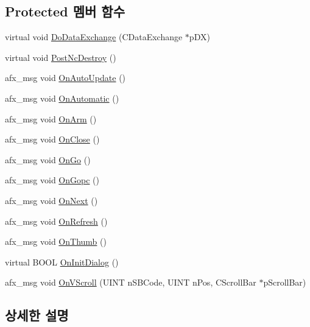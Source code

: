 \subsection*{Protected 멤버 함수}
\begin{DoxyCompactItemize}
\item 
virtual void \mbox{\hyperlink{class_disassemble_a41d0930174f47e08037b1ea675d03ba0}{Do\+Data\+Exchange}} (C\+Data\+Exchange $\ast$p\+DX)
\item 
virtual void \mbox{\hyperlink{class_disassemble_a2ff6c6b502de3f37aaff6c2f188157a8}{Post\+Nc\+Destroy}} ()
\item 
afx\+\_\+msg void \mbox{\hyperlink{class_disassemble_a5423cb1c85c1e4bb05b3d4018c804826}{On\+Auto\+Update}} ()
\item 
afx\+\_\+msg void \mbox{\hyperlink{class_disassemble_a713e75749b5c7c79927075b57431a298}{On\+Automatic}} ()
\item 
afx\+\_\+msg void \mbox{\hyperlink{class_disassemble_a11695fe0ce9003a5cfcd58e86ad6047e}{On\+Arm}} ()
\item 
afx\+\_\+msg void \mbox{\hyperlink{class_disassemble_a8f239c5117018f44ee0847b530a9eee1}{On\+Close}} ()
\item 
afx\+\_\+msg void \mbox{\hyperlink{class_disassemble_add1cb356f3605cc46f9c83f29473db24}{On\+Go}} ()
\item 
afx\+\_\+msg void \mbox{\hyperlink{class_disassemble_ad757b7defc104599f1a20730cf7f3d63}{On\+Gopc}} ()
\item 
afx\+\_\+msg void \mbox{\hyperlink{class_disassemble_a9d25720f4d6c7a31281301b93b0ae02a}{On\+Next}} ()
\item 
afx\+\_\+msg void \mbox{\hyperlink{class_disassemble_a9b66d72bb746fe9df6bbcb4831dbf8ad}{On\+Refresh}} ()
\item 
afx\+\_\+msg void \mbox{\hyperlink{class_disassemble_a480844a650f1a7ab4a396ff1ffdd5655}{On\+Thumb}} ()
\item 
virtual B\+O\+OL \mbox{\hyperlink{class_disassemble_a23e74e8f32758c5b6ff63914633e2ab5}{On\+Init\+Dialog}} ()
\item 
afx\+\_\+msg void \mbox{\hyperlink{class_disassemble_a96149abe6cfe456c0d799dfe59b19826}{On\+V\+Scroll}} (U\+I\+NT n\+S\+B\+Code, U\+I\+NT n\+Pos, C\+Scroll\+Bar $\ast$p\+Scroll\+Bar)
\end{DoxyCompactItemize}


\subsection{상세한 설명}



